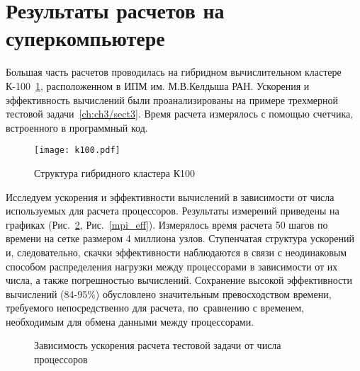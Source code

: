 \section{Результаты расчетов на суперкомпьютере} \label{ch:ch4/sect2}

Большая часть расчетов проводилась на гибридном вычислительном кластере К-100~\ref{pic_k100}, расположенном в ИПМ им. М.В.Келдыша РАН.
Ускорения и эффективность вычислений были проанализированы на примере трехмерной тестовой задачи~\ref{ch:ch3/sect3}.
Время расчета измерялось с помощью счетчика, встроенного в программный код.

\begin{figure}[!h]\center
\texttt{[image: k100.pdf]} 
\caption{Структура гибридного кластера К100}
\label{pic_k100}
\end{figure}

Исследуем ускорения и эффективности вычислений в зависимости от числа
используемых для расчета процессоров. Результаты измерений приведены
на графиках (Рис.~\ref{mpi_speedup}, Рис.~\ref{mpi_eff}).
Измерялось время расчета 50 шагов по времени на сетке размером 4 миллиона узлов.
Ступенчатая структура ускорений и, следовательно, скачки эффективности наблюдаются
в связи с неодинаковым способом распределения нагрузки между процессорами
в зависимости от их числа, а также погрешностью вычислений. Сохранение высокой
эффективности вычислений (84-95\%) обусловлено значительным превосходством времени, требуемого
непосредственно для расчета, по~сравнению с временем, необходимым для обмена данными
между процессорами.

\begin{figure}[!h]
\begin{center}
\caption{Зависимость ускорения расчета тестовой задачи от числа процессоров}
\label{mpi_speedup}
\end{center}
\end{figure}

